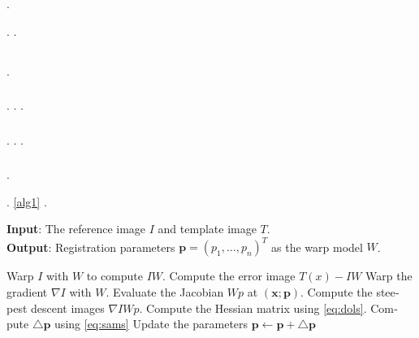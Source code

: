 \documentclass{article}
\begin{document}
              .          
\cite{diyanat1389}
    
   .                    
\cite{Yang2010Modeling}   \cite{Beran1995Long}.



\subsection{       }
                     . 
\subsubsection{     }
                                                           .                                                          .                                                      .
\subsubsection{           }
                         .                                        .                                                            .



\subsubsection{       }
\label{Sec:TheProposedMethod}
                                              . 

                 
     .        
\ref{alg1}
     .
\begin{algorithm}[t]
\caption{       -         -  .}
\label{alg1}
\begin{latin}
\textbf{Input}:
The reference image $I$ and template image $T$.\\
\textbf{Output}: Registration parameters
$\mathbf{p}=(p_1,\dots,p_n)^T$ as the warp model $W$.
\begin{algorithmic}[1]
\REPEAT
  \STATE Warp $I$ with $W$ to compute $IW$. 
  \STATE Compute the error image $T(x)-IW$ 
  \STATE Warp the gradient $\nabla I$ with $W$. \STATE Evaluate the Jacobian
    ${W}{p}$ at $(\mathbf{x;p})$. 
  \STATE Compute the steepest descent images $\nabla I{W}{p}$. 
\LOOP {} \ENDLOOP
  \STATE \label{line:Hessian} Compute the Hessian matrix using   \eqref{eq:dols}. 
  \ENDFOR
  \STATE \label{alg1:deltap} Compute $\triangle\mathbf{p}$ using \eqref{eq:sams} 
\RETURN Update the parameters $\mathbf{p}\leftarrow\mathbf{p}+\triangle\mathbf{p}$ 
\end{algorithmic}
\end{latin}
\end{algorithm}
\end{document}
